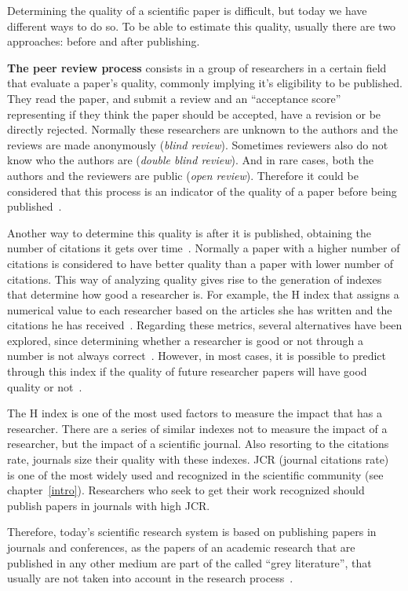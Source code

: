Determining the quality of a scientific paper is difficult, but today we have
different ways to do so. To be able to estimate this quality, usually there are
two approaches: before and after publishing.

\textbf{The peer review process} consists in a group of researchers in a certain
field that evaluate a paper's quality, commonly implying it's eligibility to be
published. They read the paper, and submit a review and an ``acceptance score''
representing if they think the paper should be accepted, have a revision or be
directly rejected. Normally these researchers are unknown to the authors and the
reviews are made anonymously (\emph{blind review}). Sometimes reviewers also do
not know who the authors are (\emph{double blind review}). And in rare cases,
both the authors and the reviewers are public (\emph{open review}). Therefore it
could be considered that this process is an indicator of the quality of a paper
before being published~\cite{szklo2006quality}.

Another way to determine this quality is after it is published, obtaining the
number of citations it gets over time~\cite{redner1998popular}. Normally a paper
with a higher number of citations is considered to have better quality than a
paper with lower number of citations. This way of analyzing quality gives rise
to the generation of indexes that determine how good a researcher is. For
example, the H index that assigns a numerical value to each researcher based on
the articles she has written and the citations he has
received~\cite{bornmann2007we}. Regarding these metrics, several alternatives
have been explored, since determining whether a researcher is good or not
through a number is not always correct~\cite{bornmann2008there}. However, in
most cases, it is possible to predict through this index if the quality of
future researcher papers will have good quality or not~\cite{hirsch2007does}.

The H index is one of the most used factors to measure the impact that has a
researcher. There are a series of similar indexes not to measure the impact of a
researcher, but the impact of a scientific journal. Also resorting to the
citations rate, journals size their quality with these indexes. JCR (journal
citations rate)~\cite{doi:10.1001/jama.295.1.90} is one of the most widely used
and recognized in the scientific community (see chapter~\ref{intro}).
Researchers who seek to get their work recognized should publish papers in
journals with high JCR.

Therefore, today's scientific research system is based on publishing papers in
journals and conferences, as the papers of an academic research that are
published in any other medium are part of the called ``grey literature'', that
usually are not taken into account in the research
process~\cite{rothstein2009grey}.

